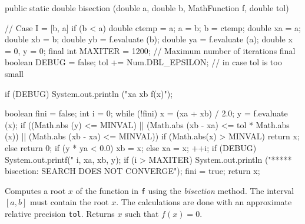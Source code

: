 \begin{code}

   public static double bisection (double a, double b,
                                   MathFunction f, double tol)\begin{hide} {
      // Case I = [b, a]
      if (b < a) {
         double ctemp = a;
         a = b;
         b = ctemp;
      }
      double xa = a;
      double xb = b;
      double yb = f.evaluate (b);
      double ya = f.evaluate (a);
      double x = 0, y = 0;
      final int MAXITER = 1200;   // Maximum number of iterations
      final boolean DEBUG = false;
      tol += Num.DBL_EPSILON; // in case tol is too small

      if (DEBUG)
         System.out.println
         ("\niter              xa                   xb              f(x)");

      boolean fini = false;
      int i = 0;
      while (!fini) {
         x = (xa + xb) / 2.0;
         y = f.evaluate (x);
         if ((Math.abs (y) <= MINVAL) ||
             (Math.abs (xb - xa) <= tol * Math.abs (x)) ||
             (Math.abs (xb - xa) <= MINVAL)) {
            if (Math.abs(x) > MINVAL)
               return x;
            else
               return 0;
         }
         if (y * ya < 0.0)
            xb = x;
         else
            xa = x;
         ++i;
         if (DEBUG)
            System.out.printf("%
                              i, xa, xb, y);
         if (i > MAXITER) {
            System.out.println ("***** bisection:  SEARCH DOES NOT CONVERGE");
            fini = true;
         }
      }
      return x;
   }\end{hide}
\end{code}
\begin{tabb} Computes a root $x$ of the function in \texttt{f} using the
    \emph{bisection} method. The interval $[a, b]$ must contain the root $x$.
    The calculations are done with an approximate relative precision
    \texttt{tol}.  Returns $x$ such that $f(x) = 0$.
 \end{tabb}
\begin{htmlonly}
\end{htmlonly}

\begin{code}\begin{hide}
}\end{hide}
\end{code}
